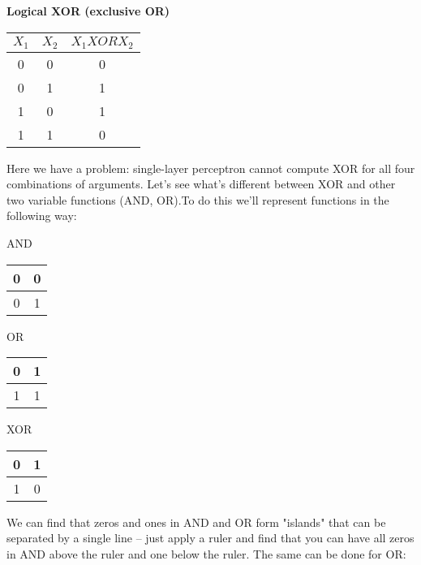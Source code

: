 \textbf{Logical XOR (exclusive OR)}
\begin{center}
\begin{tabular}{c|c|c}
$X_1$ & $X_2$ & $X_1 XOR X_2$ \\
\hline
0&0&0 \\
0&1&1 \\
1&0&1 \\
1&1&0 \\
\end{tabular}
\end{center}

Here we have a problem: single-layer perceptron cannot compute
XOR for all four combinations of arguments.
Let's see what's different between XOR and other two variable
functions (AND, OR).To do this we'll 
represent functions in the following way:

\begin{center}
AND

\medskip
\begin{tabular}{c|c}
0&0 \\
\hline
0&1
\end{tabular}
\end{center}

\medskip
\begin{center}
OR

\medskip
\begin{tabular}{c|c}
0&1 \\
\hline
1&1
\end{tabular}
\end{center}

\medskip
\begin{center}
XOR

\medskip
\begin{tabular}{c|c}
0&1 \\
\hline
1&0
\end{tabular}
\end{center}

We can find that zeros and ones in AND and OR form "islands"
that can be separated by a single line -- just apply a ruler
and find that you can have all zeros in AND above the ruler
and one below the ruler. The same can be done for OR:

\bigskip
\begin{center}
\end{center}
\bigskip



